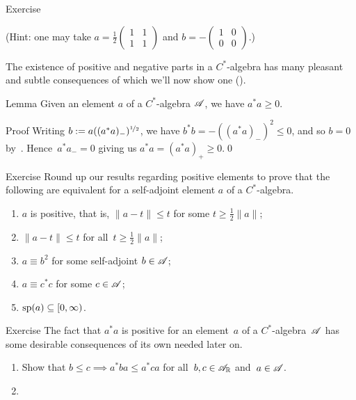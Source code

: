 \documentclass[a]{subfiles}
\begin{document}
\begin{parsec}
\begin{point}{Exercise}
\begin{enumerate}
(Hint: one may take  
$a=\frac{1}{2}\left(\begin{smallmatrix}1 & 1 \\ 1 & 1\end{smallmatrix}\right)$
and $b=-\left(\begin{smallmatrix}1 & 0 \\ 0 & 0 \end{smallmatrix}\right)$.)
\end{enumerate}
\end{point}
\begin{point}%
The existence of positive and negative parts
in a $C^*$-algebra
has many pleasant and subtle consequences
of which we'll now show one ().
\end{point}
\begin{point}{Lemma}%
Given an element $a$ of a $C^*$-algebra $\mathscr{A}$,
we have $a^*a\geq 0$.
\begin{point}{Proof}%
Writing $b:=a((a^*a)_-)^{\nicefrac{1}{2}}$,
we have $b^*b=-((a^*a)_-)^2\leq 0$,
and so $b=0$ by~.
Hence~$a^*a_-=0$ giving us $a^*a=(a^*a)_+\geq 0$.\qed
\end{point}
\end{point}
\begin{point}{Exercise}%
Round up our results regarding positive elements
to 
prove that
the following are equivalent
for a self-adjoint element $a$ of a $C^*$-algebra.
\begin{enumerate}
\item 
$a$ is positive, that is,  $\|a-t\|\leq t$
for some $t\geq \frac{1}{2}\|a\|$;
\item
$\|a-t\|\leq t$ for all~$t\geq \frac{1}{2}\|a\|$;
\item
$a\equiv b^2$ for some self-adjoint $b\in\mathscr{A}$;
\item
$a\equiv c^* c$ for some $c\in\mathscr{A}$;
\item
$\mathrm{sp}(a)\subseteq [0,\infty)$.
\end{enumerate}
\end{point}
\begin{point}{Exercise}%
The fact that $a^*a$ is positive
for an element~$a$ of a $C^*$-algebra~$\mathscr{A}$
has some desirable consequences
of its own needed later on.
\begin{enumerate}
\item
Show that $b\leq c\implies a^*ba \leq a^*ca$
for all~$b,c\in\mathscr{A}_{\mathbb{R}}$ and~$a\in\mathscr{A}$.
\item

\end{enumerate}
\end{point}
\end{parsec}
\end{document}
